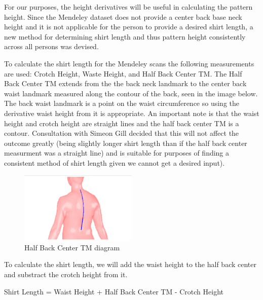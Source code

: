 For our purposes, the height derivatives will be useful in calculating the pattern height. Since the Mendeley dataset does not provide a center back base neck height and it is not applicable for the person to provide a desired shirt length, a new method for determining shirt length and thus pattern height consistently across all persons was devised.

To calculate the shirt length for the Mendeley scans the following measurements are used: Crotch Height, Waste Height, and Half Back Center TM. The Half Back Center TM extends from the the back neck landmark to the center back waist landmark measured along the contour of the back, seen in the image below. The back waist landmark is a point on the waist circumference so using the derivative waist height from it is appropriate. An important note is that the waist height and crotch height are straight lines and the half back center TM is a contour. Consultation with Simeon Gill decided that this will not affect the outcome greatly (being slightly longer shirt length than if the half back center measurment was a straight line) and is suitable for purposes of finding a consistent method of shirt length given we cannot get a desired input).
\begin{figure} [H] %
    \centering %
    \includegraphics[width = 0.5\textwidth]{Images/HBC TM.png} %
    \caption{Half Back Center TM diagram}
\end{figure}
To calculate the shirt length, we will add the waist height to the half back center and substract the crotch height from it.

Shirt Length = Waist Height + Half Back Center TM - Crotch Height

